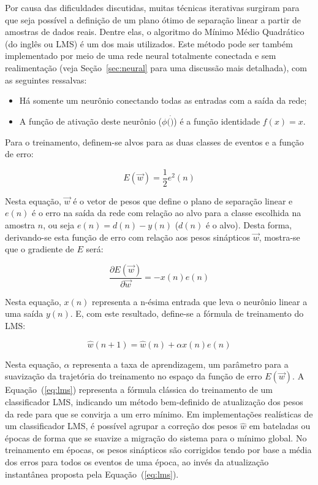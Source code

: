 Por causa das dificuldades discutidas, muitas técnicas iterativas surgiram
para que seja possível a definição de um plano ótimo de separação linear a
partir de amostras de dados reais. Dentre elas, o algoritmo do Mínimo Médio
Quadrático \cite{widrow} (do inglês  ou LMS) é um dos
mais utilizados. Este método pode ser também implementado por meio de uma rede
neural totalmente conectada e sem realimentação (veja Seção~\ref{sec:neural}
para uma discussão mais detalhada), com as seguintes ressalvas:

\begin{itemize}
\item Há somente um neurônio conectando todas as entradas com a saída da rede;
\item A função de ativação deste neurônio ($\phi(\dot)$) é a função identidade
$f(x) = x$.
\end{itemize}

Para o treinamento, definem-se alvos para as duas classes de eventos e a
função de erro:

\begin{equation}
E(\overrightarrow{w}) = \frac{1}{2} e^2(n)
\label{eq:mse-definition}
\end{equation}

Nesta equação, $\overrightarrow{w}$ é o vetor de pesos que define o plano de
separação linear e $e(n)$ é o erro na saída da rede com relação ao alvo para a
classe escolhida na amostra $n$, ou seja $e(n) = d(n)-y(n)$ ($d(n)$ é o
alvo). Desta forma, derivando-se esta função de erro com relação aos pesos
sinápticos $\overrightarrow{w}$, mostra-se que o gradiente de $E$ será:

\begin{equation}
\frac{\partial E(\overrightarrow{w})}{\partial \overrightarrow{w}} =
-x(n)e(n) 
\end{equation}

Nesta equação, $x(n)$ representa a n-ésima entrada que leva o neurônio linear
a uma saída $y(n)$. E, com este resultado, define-se a fórmula de treinamento
do LMS:

\begin{equation}
\hat{w}(n+1) = \hat{w}(n) + \alpha x(n)e(n)
\label{eq:lms}
\end{equation}

Nesta equação, $\alpha$ representa a taxa de aprendizagem, um parâmetro para a
suavização da trajetória do treinamento no espaço da função de erro
$E(\overrightarrow{w})$. A Equação~(\ref{eq:lms}) representa a fórmula
clássica do treinamento de um classificador LMS, indicando um método
bem-definido de atualização dos pesos da rede para que se convirja a um erro
mínimo. Em implementações realísticas de um classificador LMS, é possível
agrupar a correção dos pesos $\hat{w}$ em bateladas ou épocas de forma que se
suavize a migração do sistema para o mínimo global. No treinamento em épocas,
os pesos sinápticos são corrigidos tendo por base a média dos erros para todos
os eventos de uma época, ao invés da atualização instantânea proposta pela
Equação~(\ref{eq:lms}).

